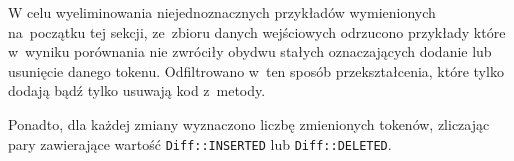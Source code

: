 \documentclass[twoside]{praca}
\begin{document}
W celu wyeliminowania niejednoznacznych przykładów wymienionych na~początku tej sekcji, ze~zbioru danych wejściowych odrzucono przykłady które w~wyniku porównania nie zwróciły obydwu stałych oznaczających dodanie lub usunięcie danego tokenu. Odfiltrowano w~ten sposób przekształcenia, które tylko dodają bądź tylko usuwają kod z~metody.
 
Ponadto, dla każdej zmiany wyznaczono liczbę zmienionych tokenów, zliczając pary zawierające wartość \texttt{Diff::INSERTED} lub \texttt{Diff::DELETED}.




\end{document}
